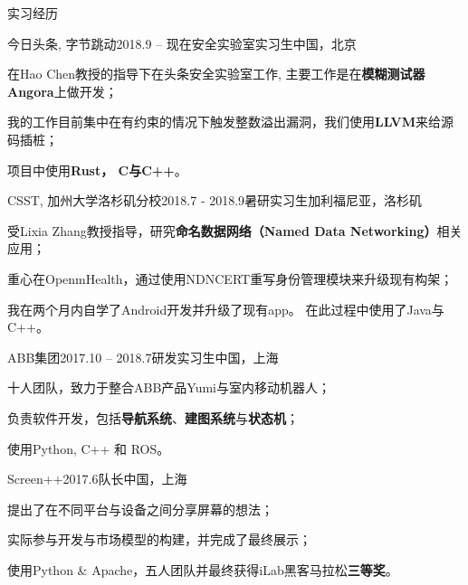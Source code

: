 \documentclass{resume} %
\begin{document}
\begin{rSection}{实习经历}

\begin{rSubsection}
  {今日头条, 字节跳动}{2018.9 – 现在}{安全实验室实习生}{中国，北京}
    \item 在Hao Chen教授的指导下在头条安全实验室工作, 主要工作是在\textbf{模糊测试器 Angora}上做开发；
    \item 我的工作目前集中在有约束的情况下触发整数溢出漏洞，我们使用\textbf{LLVM}来给源码插桩；
    \item 项目中使用\textbf{Rust， C与C++}。
\end{rSubsection}


\begin{rSubsection}
  {CSST, 加州大学洛杉矶分校}{2018.7 - 2018.9}{暑研实习生}{加利福尼亚，洛杉矶}
    \item 受Lixia Zhang教授指导，研究\textbf{命名数据网络（Named Data Networking）}相关应用；
    \item 重心在OpenmHealth，通过使用NDNCERT重写身份管理模块来升级现有构架；
    \item 我在两个月内自学了Android开发并升级了现有app。 在此过程中使用了Java与C++。
\end{rSubsection}


\begin{rSubsection}
  {ABB集团}{2017.10 – 2018.7}{研发实习生}{中国，上海}
    \item 十人团队，致力于整合ABB产品Yumi与室内移动机器人；
    \item 负责软件开发，包括\textbf{导航系统}、\textbf{建图系统}与\textbf{状态机}；
    \item 使用Python, C++ 和 ROS。
\end{rSubsection}


\begin{rSubsection}
  {Screen++}{2017.6}{队长}{中国，上海}
    \item 提出了在不同平台与设备之间分享屏幕的想法；
    \item 实际参与开发与市场模型的构建，并完成了最终展示；
    \item 使用Python \& Apache，五人团队并最终获得iLab黑客马拉松\textbf{三等奖}。
\end{rSubsection}

\end{rSection}
\end{document}
